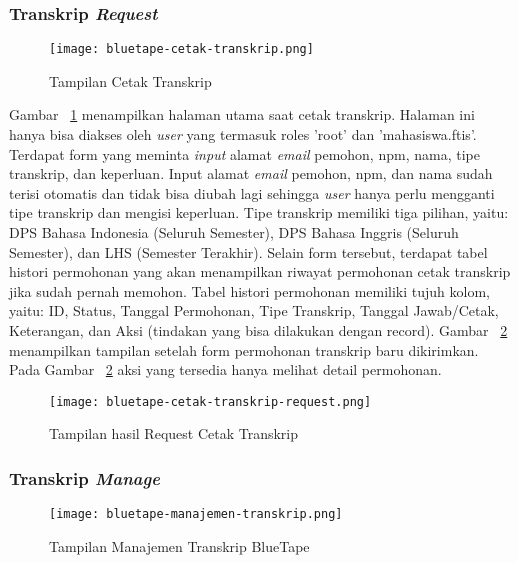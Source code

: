 	\subsubsection{Transkrip \textit{Request}} 
	\begin{figure}[H]
		\centering  
		\texttt{[image: bluetape-cetak-transkrip.png]}  
		\caption[Tampilan Cetak Transkrip]{Tampilan Cetak Transkrip} 
		\label{fig:bluetape-cetak-transkrip} 
	\end{figure}
	
	Gambar~ \ref{fig:bluetape-cetak-transkrip} menampilkan halaman utama saat cetak transkrip. Halaman ini hanya bisa diakses oleh \textit{user} yang termasuk roles 'root' dan 'mahasiswa.ftis'. Terdapat form yang meminta \textit{input} alamat \textit{email} pemohon, npm, nama, tipe transkrip, dan keperluan. Input alamat \textit{email} pemohon, npm, dan nama sudah terisi otomatis dan tidak bisa diubah lagi sehingga \textit{user} hanya perlu mengganti tipe transkrip dan mengisi keperluan. Tipe transkrip memiliki tiga pilihan, yaitu: DPS Bahasa Indonesia (Seluruh Semester), DPS Bahasa Inggris (Seluruh Semester), dan LHS (Semester Terakhir). Selain form tersebut, terdapat tabel histori permohonan yang akan menampilkan riwayat permohonan cetak transkrip jika sudah pernah memohon. Tabel histori permohonan memiliki tujuh kolom, yaitu: ID, Status, Tanggal Permohonan, Tipe Transkrip, Tanggal Jawab/Cetak, Keterangan, dan Aksi (tindakan yang bisa dilakukan dengan record). Gambar~ \ref{fig:bluetape-cetak-transkrip-request} menampilkan tampilan setelah form permohonan transkrip baru dikirimkan. Pada Gambar~ \ref{fig:bluetape-cetak-transkrip-request} aksi yang tersedia hanya melihat detail permohonan.

	\begin{figure}[H]
		\centering  
		\texttt{[image: bluetape-cetak-transkrip-request.png]}  
		\caption[Tampilan hasil Request Cetak Transkrip]{Tampilan hasil Request Cetak Transkrip} 
		\label{fig:bluetape-cetak-transkrip-request} 
	\end{figure}
	
	\subsubsection{Transkrip \textit{Manage}}
	\begin{figure}[H]
		\centering  
		\texttt{[image: bluetape-manajemen-transkrip.png]}  
		\caption[Tampilan Manajemen Transkrip BlueTape]{Tampilan Manajemen Transkrip BlueTape} 
		\label{fig:bluetape-manajemen-transkrip} 
	\end{figure}
	
